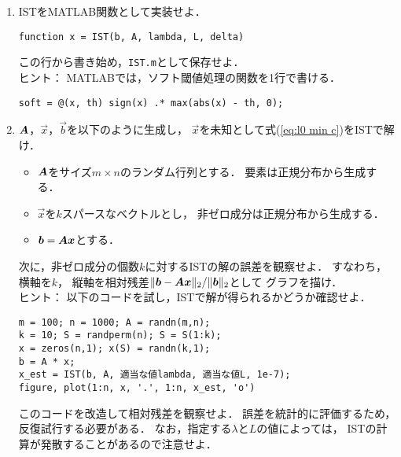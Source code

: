 \begin{enumerate}
\item
ISTをMATLAB関数として実装せよ．
\lstset{xleftmargin=4ex,xrightmargin=4ex}
\begin{lstlisting}
function x = IST(b, A, lambda, L, delta)
\end{lstlisting}
この行から書き始め，{\tt IST.m}として保存せよ．\\
ヒント：
MATLABでは，ソフト閾値処理の関数を1行で書ける．
\begin{lstlisting}
soft = @(x, th) sign(x) .* max(abs(x) - th, 0);
\end{lstlisting}


\item \label{ex:random sparse convex solution}
$\mbox{\boldmath $A$}$，$\vec x$，$\vec b$を以下のように生成し，
$\vec x$を未知として式(\ref{eq:l0 min c})をISTで解け．
\begin{itemize}
\item
$\mbox{\boldmath $A$}$をサイズ$m\times n$のランダム行列とする．
要素は正規分布から生成する．
\item
$\vec x$を$k$スパースなベクトルとし，
非ゼロ成分は正規分布から生成する．
\item $\mbox{\boldmath $b$}=\mbox{\boldmath $A$}\mbox{\boldmath $x$}$とする．
\end{itemize}
次に，非ゼロ成分の個数$k$に対するISTの解の誤差を観察せよ．
すなわち，横軸を$k$，
縦軸を相対残差$\|\mbox{\boldmath $b$}-\mbox{\boldmath $A$}\mbox{\boldmath $x$}\|_2/\|\mbox{\boldmath $b$}\|_2$として
グラフを描け．\\
ヒント：
以下のコードを試し，ISTで解が得られるかどうか確認せよ．
\begin{lstlisting}
m = 100; n = 1000; A = randn(m,n);
k = 10; S = randperm(n); S = S(1:k);
x = zeros(n,1); x(S) = randn(k,1);
b = A * x;
x_est = IST(b, A, 適当な値lambda, 適当な値L, 1e-7);
figure, plot(1:n, x, '.', 1:n, x_est, 'o')
\end{lstlisting}
このコードを改造して相対残差を観察せよ．
誤差を統計的に評価するため，反復試行する必要がある．
なお，指定する$\lambda$と$L$の値によっては，
ISTの計算が発散することがあるので注意せよ．

\end{enumerate}






{\footnotesize

}

